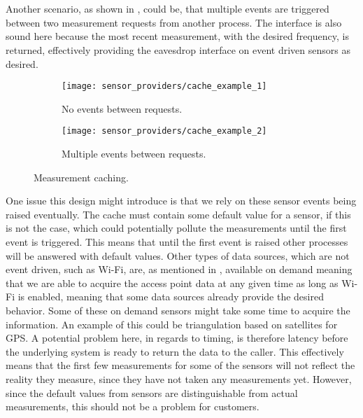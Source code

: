 \\\\
Another scenario, as shown in , could be, that multiple events are triggered between two measurement requests from another process. The interface is also sound here because the most recent measurement, with the desired frequency, is returned, effectively providing the eavesdrop interface on event driven sensors as desired.

\begin{figure}[!htbp]
\begin{subfigure}[!t]{.5\textwidth}
  \centering
  \texttt{[image: sensor\_providers/cache\_example\_1]}
  \caption{No events between requests.}
  \label{fig:cache_no_event_between}
\end{subfigure}
\begin{subfigure}[!t]{.5\textwidth}
  \centering
  \texttt{[image: sensor\_providers/cache\_example\_2]}
  \caption{Multiple events between requests.}
  \label{fig:cache_multiple_event_between}
\end{subfigure}
\caption{Measurement caching.}
\label{fig:cache_examples}
\end{figure}
\FloatBarrier

One issue this design might introduce is that we rely on these sensor events being raised eventually. The cache must contain some default value for a sensor, if this is not the case, which could potentially pollute the measurements until the first event is triggered. This means that until the first event is raised other processes will be answered with default values. Other types of data sources, which are not event driven, such as Wi-Fi, are, as mentioned in , available on demand meaning that we are able to acquire the access point data at any given time as long as Wi-Fi is enabled, meaning that some data sources already provide the desired behavior. Some of these on demand sensors might take some time to acquire the information. An example of this could be triangulation based on satellites for GPS. A potential problem here, in regards to timing, is therefore latency before the underlying system is ready to return the data to the caller. This effectively means that the first few measurements for some of the sensors will not reflect the reality they measure, since they have not taken any measurements yet. However, since the default values from sensors are distinguishable from actual measurements, this should not be a problem for customers.

